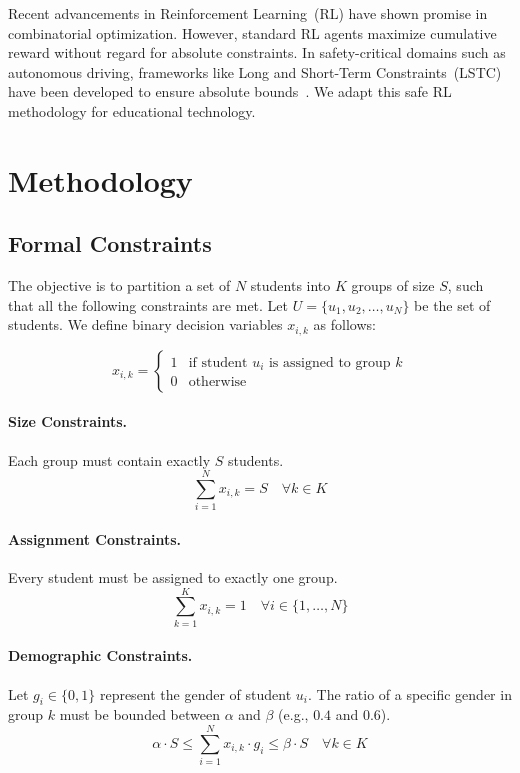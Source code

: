 \documentclass{icai2026} %
\begin{document}
Recent advancements in Reinforcement Learning~(RL) have shown promise in combinatorial optimization. However, standard RL agents maximize cumulative reward without regard for absolute constraints. In safety-critical domains such as autonomous driving, frameworks like Long and Short-Term Constraints~(LSTC) have been developed to ensure absolute bounds~\cite{LongShort, Garcia2015}. We adapt this safe RL methodology for educational technology.

\section{Methodology}\label{section:method}

\subsection{Formal Constraints}\label{section:contraints}

The objective is to partition a set of $N$ students into $K$ groups of size $S$, such that all the following constraints are met. Let $U = \{u_1, u_2, \dots, u_N\}$ be the set of students. We define binary decision variables $x_{i,k}$ as follows:

\begin{equation}
x_{i,k} = 
\begin{cases} 
1 & \text{if student } u_i \text{ is assigned to group } k \\
0 & \text{otherwise}
\end{cases}
\end{equation}

\paragraph{Size Constraints.} Each group must contain exactly $S$ students.
\begin{equation}
\sum_{i=1}^{N} x_{i,k} = S \quad \forall k \in K
\end{equation}

\paragraph{Assignment Constraints.} Every student must be assigned to exactly one group.
\begin{equation}
\sum_{k=1}^{K} x_{i,k} = 1 \quad \forall i \in \{1, \dots, N\}
\end{equation}

\paragraph{Demographic Constraints.} Let $g_i \in \{0, 1\}$ represent the gender of student $u_i$. The ratio of a specific gender in group $k$ must be bounded between $\alpha$ and $\beta$ (e.g., $0.4$ and $0.6$).
\begin{equation}
\alpha \cdot S \le \sum_{i=1}^{N} x_{i,k} \cdot g_i \le \beta \cdot S \quad \forall k \in K
\end{equation}
\end{document}

